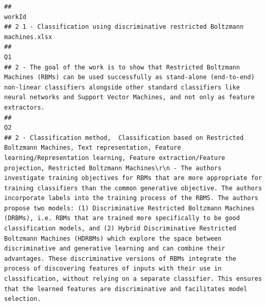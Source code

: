 \documentclass[
]{article}
\begin{document}
\begin{verbatim}
##                                                                       workId
## 2 1 - Classification using discriminative restricted Boltzmann machines.xlsx
##                                                                                                                                                                                                                                                                                   Q1
## 2 - The goal of the work is to show that Restricted Boltzmann Machines (RBMs) can be used successfully as stand-alone (end-to-end) non-linear classifiers alongside other standard classifiers like neural networks and Support Vector Machines, and not only as feature extractors.
##                                                                                                                                                                                                                                                                                                                                                                                                                                                                                                                                                                                                                                                                                                                                                                                                                                                                                                                                                                                                                                                                           Q2
## 2 - Classification method,  Classification based on Restricted Boltzmann Machines, Text representation, Feature learning/Representation learning, Feature extraction/Feature projection, Restricted Boltzmann Machines\r\n - The authors investigate training objectives for RBMs that are more appropriate for training classifiers than the common generative objective. The authors incorporate labels into the training process of the RBMS. The authors propose two models: (1) Discriminative Restricted Boltzmann Machines (DRBMs), i.e. RBMs that are trained more specifically to be good classification models, and (2) Hybrid Discriminative Restricted Boltzmann Machines (HDRBMs) which explore the space between discriminative and generative learning and can combine their advantages. These discriminative versions of RBMs integrate the process of discovering features of inputs with their use in classification, without relying on a separate classifier. This ensures that the learned features are discriminative and facilitates model selection.

\end{verbatim}
\end{document}
